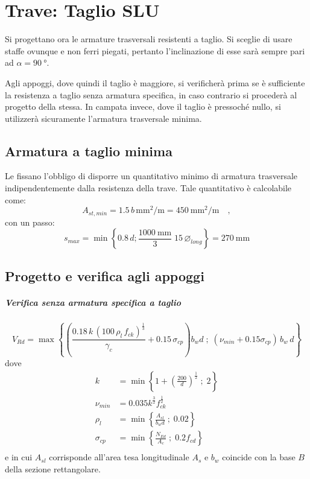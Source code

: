 \chapter{Trave: Taglio SLU}
Si progettano ora le armature trasversali resistenti a taglio. 
Si sceglie di usare staffe ovunque e non ferri piegati, pertanto l'inclinazione di esse sarà sempre pari ad $\alpha = \SI{90}{\degree}$.

Agli appoggi, dove quindi il taglio è maggiore, si verificherà prima se è sufficiente la resistenza a taglio senza armatura specifica, in caso contrario si procederà al progetto della stessa.
In campata invece, dove il taglio è pressoché nullo, si utilizzerà sicuramente l'armatura trasversale minima.

\section{Armatura a taglio minima}
Le  fissano l'obbligo di disporre un quantitativo minimo di armatura trasversale indipendentemente dalla resistenza della trave. 
Tale quantitativo è calcolabile come:
\begin{equation}
    A_{st, min} = \num{1.5} \, b \, \si{\milli\metre\squared\per\metre} = \SI{450}{\milli\metre\squared\per\metre} \quad ,
\end{equation}
con un passo:
\begin{equation}
    s_{max} = \min \left\{ 0.8\,d ; \frac{\SI{1000}{\milli\metre}}{3} \; 15\, \varnothing_{long} \right\} = \SI{270}{\milli\metre}
\end{equation} 

\section{Progetto e verifica agli appoggi}
\paragraph{Verifica senza armatura specifica a taglio}
\begin{equation}
    \label{eq:Taglio_only_cls}
    V_{Rd} = \max \left\{ \left(\frac{0.18 \, k \, (100 \, \rho_l \, f_{ck})^{\tfrac{1}{3}}}{\gamma_c} + 0.15 \, \sigma _{cp}\right) b_w d \; ; \;(\nu_{min} + 0.15\sigma _{cp}) \, b_w \, d \right\}
\end{equation}
dove 
\[
    \begin{split}
        k &= \min \left\{ 1 + \left(\frac{200}{d}\right)^ {\tfrac{1}{2}} \; ; \; 2\right\} \\
        \nu_{min} &= 0.035 k ^ \frac{3}{2} f_{ck}^ \frac{1}{2} \\
        \rho_l &= \min \left\{ \frac{A_{sl}}{b_w d} \; ; \; 0.02\right\} \\
        \sigma_{cp} &= \min \left\{ \frac{N_{Ed}}{A_c} \; ; \; 0.2 f_{cd} \right\} \\
    \end{split}
\]
e in cui $A_{sl}$ corrisponde all'area tesa longitudinale $A_s$ e $b_w$ coincide con la base $B$ della sezione rettangolare.


